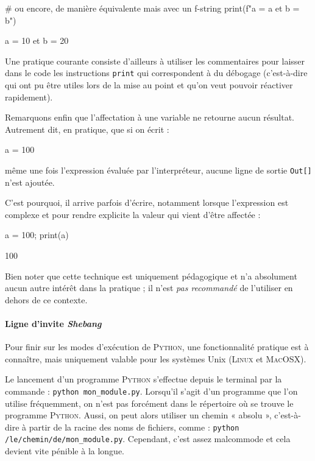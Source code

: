 \begin{nbjupyterin}[before skip=4pt, after skip=2pt]{3}
# ou encore, de manière équivalente mais avec un f-string
print(f"a = {a} et b = {b}")
\end{nbjupyterin}
\begin{nbjupyterout}[before skip=1pt, after skip=4pt]{3}
a = 10 et b = 20
\end{nbjupyterout}

Une pratique courante consiste d'ailleurs à utiliser les commentai\-res pour laisser dans le code les instructions \texttt{print} qui correspondent à du débogage (c'est-à-dire qui ont pu être utiles lors de la mise au point et qu'on veut pouvoir réactiver rapidement).

Remarquons enfin que l'affectation à une variable ne retourne aucun résultat.
Autrement dit, en pratique, que si on écrit :

\begin{nbjupyterin}[before skip=4pt, after skip=4pt]{4}
a = 100
\end{nbjupyterin}
\noindent même une fois l'expression évaluée par l'interpréteur, aucune ligne de sortie \texttt{Out[]} n'est ajoutée.

C'est pourquoi, il arrive parfois d'écrire, notamment lorsque l'expression est complexe et pour rendre explicite la valeur qui vient d'être affectée :

\begin{nbjupyterin}[before skip=4pt, after skip=2pt]{5}
a = 100; print(a)
\end{nbjupyterin}
\begin{nbjupyterout}[before skip=1pt, after skip=6pt]{5}
100
\end{nbjupyterout}

Bien noter que cette technique est uniquement pédagogique et n'a absolument aucun autre intérêt dans la pratique ; il n'est \emph{pas recommandé} de l'utiliser en dehors de ce contexte.

\paragraph*{Ligne d'invite \textit{Shebang}} Pour finir sur les modes d'exécution de \textsc{Python}, une fonctionnalité pratique est à connaître, mais uniquement valable pour les systèmes Unix (\textsc{Linux} et \textsc{MacOSX}).

Le lancement d'un programme \textsc{Python} s'effectue depuis le terminal par la commande : \texttt{python mon\_module.py}.
Lorsqu'il s'agit d'un programme que l'on utilise fréquemment, on n'est pas forcément dans le répertoire où se trouve le programme \textsc{Python}. Aussi, on peut alors utiliser un chemin  « absolu », c'est-à-dire à partir de la racine des noms de fichiers, comme : \texttt{python /le/chemin/de/mon\_module.py}. Cependant, c'est assez malcommode et cela devient vite pénible à la longue.

